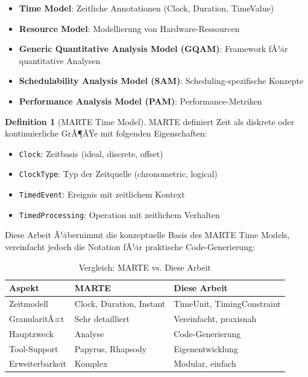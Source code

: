 ﻿\documentclass[a4paper,12pt]{scrreprt}
\theoremstyle{definition}
\newtheorem{definition}{Definition}[section]
\begin{document}
\begin{itemize}
	\item[-] \textbf{Time Model}: Zeitliche Annotationen (Clock, Duration, TimeValue)
	\item[-] \textbf{Resource Model}: Modellierung von Hardware-Ressourcen
	\item[-] \textbf{Generic Quantitative Analysis Model (GQAM)}: Framework fÃ¼r quantitative Analysen
	\item[-] \textbf{Schedulability Analysis Model (SAM)}: Scheduling-spezifische Konzepte
	\item[-] \textbf{Performance Analysis Model (PAM)}: Performance-Metriken
\end{itemize}

\begin{definition}[MARTE Time Model]
	MARTE definiert Zeit als diskrete oder kontinuierliche GrÃ¶ÃŸe mit folgenden Eigenschaften:
	\begin{itemize}
		\item[-] \texttt{Clock}: Zeitbasis (ideal, discrete, offset)
		\item[-] \texttt{ClockType}: Typ der Zeitquelle (chronometric, logical)
		\item[-] \texttt{TimedEvent}: Ereignis mit zeitlichem Kontext
		\item[-] \texttt{TimedProcessing}: Operation mit zeitlichem Verhalten
	\end{itemize}
\end{definition}

Diese Arbeit Ã¼bernimmt die konzeptuelle Basis des MARTE Time Models, vereinfacht jedoch die Notation fÃ¼r praktische Code-Generierung:

\begin{table}[H]
	\centering
	\begin{tabular}{@{}lll@{}}
		\toprule
		\textbf{Aspekt} & \textbf{MARTE} & \textbf{Diese Arbeit} \\
		\midrule
		Zeitmodell & Clock, Duration, Instant & TimeUnit, TimingConstraint \\
		GranularitÃ¤t & Sehr detailliert & Vereinfacht, praxisnah \\
		Hauptzweck & Analyse & Code-Generierung \\
		Tool-Support & Papyrus, Rhapsody & Eigenentwicklung \\
		Erweiterbarkeit & Komplex & Modular, einfach \\
		\bottomrule
	\end{tabular}
	\caption{Vergleich: MARTE vs. Diese Arbeit}
	\label{tab:marte-comparison}
\end{table}
\end{document}
